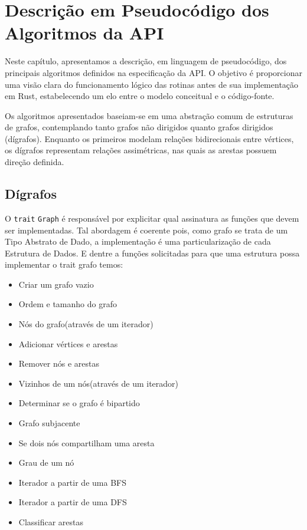 \chapter{Descrição em Pseudocódigo dos Algoritmos da API}
\label{ch:pseudocode}

Neste capítulo, apresentamos a descrição, em linguagem de pseudocódigo, dos principais algoritmos definidos na especificação da API. O objetivo é proporcionar uma visão clara do funcionamento lógico das rotinas antes de sua implementação em Rust, estabelecendo um elo entre o modelo conceitual e o código-fonte.

Os algoritmos apresentados baseiam-se em uma abstração comum de estruturas de grafos, contemplando tanto grafos não dirigidos quanto grafos dirigidos (dígrafos). Enquanto os primeiros modelam relações bidirecionais entre vértices, os dígrafos representam relações assimétricas, nas quais as arestas possuem direção definida. 

\section{Dígrafos}
O \texttt{trait} \texttt{Graph} é responsável por explicitar qual assinatura as funções que devem ser implementadas. Tal abordagem é coerente pois, como grafo se trata de um Tipo Abstrato de Dado, a implementação é uma particularização de cada Estrutura de Dados. E dentre a funções solicitadas para que uma estrutura possa implementar o trait grafo temos:

\begin{itemize}
  \item Criar um grafo vazio
  \item Ordem e tamanho do grafo
  \item Nós do grafo(através de um iterador)
  \item Adicionar vértices e arestas
  \item Remover nós e arestas
  \item Vizinhos de um nós(através de um iterador)
  \item Determinar se o grafo é bipartido
  \item Grafo subjacente
  \item Se dois nós compartilham uma aresta
  \item Grau de um nó
  \item Iterador a partir de uma BFS
  \item Iterador a partir de uma DFS
  \item Classificar arestas
\end{itemize}

